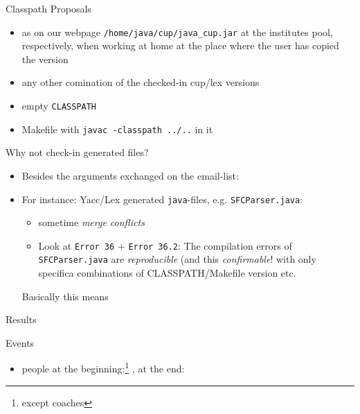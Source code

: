 \begin{myslide}{Classpath}
  Proposals
  \begin{itemize}
  \item as on our webpage \verb+/home/java/cup/java_cup.jar+ at the
    institutes pool, respectively, when working at home at the place where
    the user has copied the version
  \item any other comination of the checked-in cup/lex versions
  \item empty \texttt{CLASSPATH}
  \item Makefile with \verb+javac -classpath ../..+ in it
  \end{itemize}
\end{myslide}

\begin{myslide}{Why not check-in generated files?}
  \begin{itemize}
  \item Besides the arguments exchanged on the email-list:
  \item For instance: Yacc/Lex generated \texttt{java}-files, e.g.
    \texttt{SFCParser.java}:
    \begin{itemize}
    \item sometime \emph{merge conflicts}
    \item Look at \texttt{Error 36} + \texttt{Error 36.2}: The compilation
      errors of \texttt{SFCParser.java} are \emph{reproducible} (and this
      \emph{confirmable}! with only specifica combinations of
      CLASSPATH/Makefile version etc. 
    \end{itemize}
    Basically this means
    \begin{center}
    \end{center}
  \end{itemize}
  
\end{myslide}





\begin{myslide}{Results}
  
\end{myslide}



\begin{myslide}{Events}
  \begin{itemize}
  \item people at the beginning:\footnote{except coaches} ,
    at the end: 
  \end{itemize}
\end{myslide}

